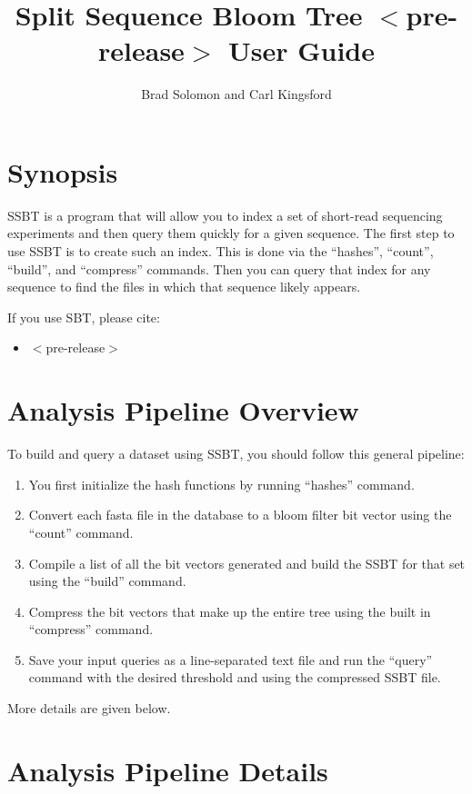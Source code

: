 \documentclass{article}
\title{Split Sequence Bloom Tree $<$pre-release$>$ User Guide}
\author{Brad Solomon and Carl Kingsford}
\begin{document}
\maketitle

\section{Synopsis}

SSBT is a program that will allow you to index a set of short-read sequencing experiments and then query them quickly for a given sequence. The first step to use SSBT is to create such an index. This is done via the ``hashes'', ``count'',  ``build'', and ``compress'' commands. Then you can query that index for any sequence to find the files in which that sequence likely appears.

If you use SBT, please cite:
\begin{itemize}
\item $<$pre-release$>$
\end{itemize}

\section{Analysis Pipeline Overview}

To build and query a dataset using SSBT, you should follow this general pipeline:
\begin{enumerate}
\item You first initialize the hash functions by running ``hashes'' command. 
\item Convert each fasta file in the database to a bloom filter bit vector using the  ``count'' command. 
\item Compile a list of all the bit vectors generated and build the SSBT for that set using the ``build'' command.
\item Compress the bit vectors that make up the entire tree using the built in ``compress'' command.
\item Save your input queries as a line-separated text file and run the ``query'' command with the desired threshold and using the compressed SSBT file.
\end{enumerate}
More details are given below.

\section{Analysis Pipeline Details}
\end{document}
